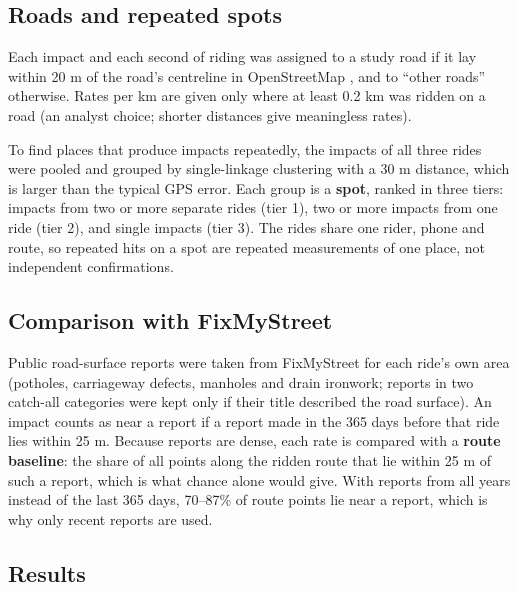 \subsection{Roads and repeated spots}\label{roads-and-repeated-spots}


Each impact and each second of riding was assigned to a study road if it lay within 20 m
of the road's centreline in OpenStreetMap \autocite{osm,overpass}, and to ``other roads''
otherwise. Rates per km are given only where at least 0.2 km was ridden on a road (an
analyst choice; shorter distances give meaningless rates).

To find places that produce impacts repeatedly, the impacts of all three rides were
pooled and grouped by single-linkage clustering \autocite{sibson1973} with a 30 m distance,
which is larger than the typical GPS error. Each group is a \textbf{spot}, ranked in three
tiers: impacts from two or more separate rides (tier 1), two or more impacts from one
ride (tier 2), and single impacts (tier 3). The rides share one rider, phone and route,
so repeated hits on a spot are repeated measurements of one place, not independent
confirmations.

\subsection{Comparison with FixMyStreet}\label{comparison-with-fixmystreet}


Public road-surface reports were taken from FixMyStreet \autocite{fixmystreet} for each ride's
own area (potholes, carriageway defects, manholes and drain ironwork; reports in two
catch-all categories were kept only if their title described the road surface). An
impact counts as near a report if a report made in the 365 days before that ride lies
within 25 m. Because reports are dense, each rate is compared with a \textbf{route
baseline}: the share of all points along the ridden route that lie within 25 m of
such a report, which is what chance alone would give. With reports from all years
instead of the last 365 days, 70--87\% of route points lie near a report, which is
why only recent reports are used.

\subsection{Results}\label{results}

